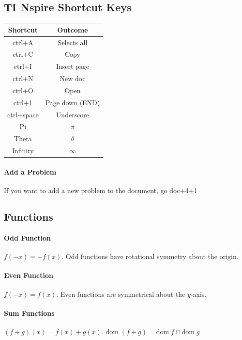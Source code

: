 \documentclass[a4paper,twoside,10pt]{article}
\begin{document}
	\subsection{TI Nspire Shortcut Keys}
	\begin{minipage}{0.5\textwidth}
		\begin{tabular}{|c|c|}
			\hline
			\textbf{Shortcut} & \textbf{Outcome} \\
			\hline
			ctrl+A & Selects all\\
			\hline
			ctrl+C & Copy \\
			\hline
			ctrl+I & Insert page \\
			\hline
			ctrl+N & New doc \\
			\hline
			ctrl+O & Open \\
			\hline
			ctrl+1 & Page down (END)\\
			\hline
			ctrl+space & Underscore \\
			\hline
			Pi & $\pi$ \\
			\hline
			Theta & $\theta$ \\
			\hline
			Infinity & $\infty$ \\
			\hline
		\end{tabular}
	\end{minipage}
	\hfill
	\begin{minipage}{0.5\textwidth}
		\paragraph{Add a Problem} If you want to add a new problem to the document, go doc+4+1
	\end{minipage}
	\subsection{Functions}
	\paragraph{Odd Function} $f(-x)=-f(x)$. Odd functions have rotational symmetry about the origin.
	\paragraph{Even Function} $f(-x)=f(x)$. Even functions are symmetrical about the $y$-axis.
	\paragraph{Sum Functions} $(f+g)(x)=f(x)+g(x)$. $\mathrm{dom}\;(f+g)=\mathrm{dom}\;f\cap\mathrm{dom}\;g$
\end{document}
